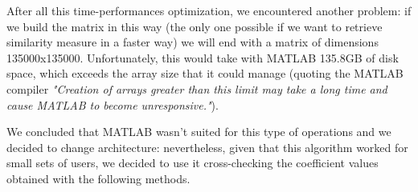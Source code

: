 After all this time-performances optimization, we encountered another problem: if we build the matrix in this way (the only one possible if we want to retrieve similarity measure in a faster way) we will end with a matrix of dimensions 135000x135000. Unfortunately, this would take with MATLAB 135.8GB of disk space, which exceeds the array size that it could manage (quoting the MATLAB compiler \textit{"Creation of
	arrays greater than this limit may take a long time and cause MATLAB to become unresponsive."}).

We concluded that MATLAB wasn't suited for this type of operations and we decided to change architecture: nevertheless, given that this algorithm worked for small sets of users, we decided to use it cross-checking the coefficient values obtained with the following methods.

\clearpage